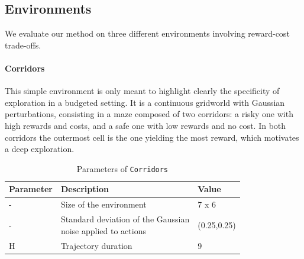 \subsection{Environments}
\label{subsec:environments}
We evaluate our method on three different environments involving reward-cost trade-offs. %

\paragraph{Corridors}
This simple environment is only meant to highlight clearly the specificity of exploration in a budgeted setting. It is a continuous gridworld with Gaussian perturbations, consisting in a maze composed of two corridors: a risky one with high rewards and costs, and a safe one with low rewards and no cost. In both corridors the outermost cell is the one yielding the most reward, which motivates a deep exploration.

\begin{table}[ht!]
    \centering
    \begin{tabular}{lll}
        \toprule
        Parameter & Description & Value\tabularnewline
        \midrule
        - & Size of the environment & 7 x 6\tabularnewline
        - & \makecell[l]{Standard deviation of the Gaussian \\noise applied to actions} & (0.25,0.25)\tabularnewline
        H & Trajectory duration & 9\tabularnewline
        \bottomrule
    \end{tabular}
    \caption{Parameters of \texttt{Corridors}}
    \label{tab:param-corridors}
\end{table}

